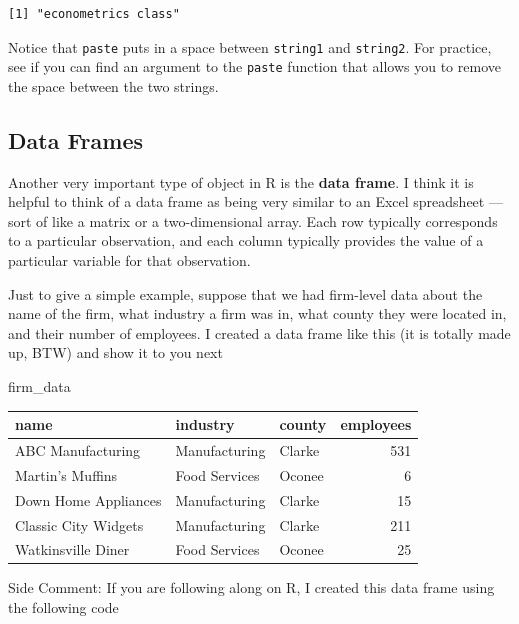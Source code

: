 \documentclass[
  letterpaper,
  DIV=11,
  numbers=noendperiod]{scrreprt}
\newenvironment{Shaded}{\begin{snugshade}}{\end{snugshade}}
\newcommand{\NormalTok}[1]{\textcolor[rgb]{0.00,0.23,0.31}{#1}}
\begin{document}
\begin{verbatim}
[1] "econometrics class"
\end{verbatim}

Notice that \texttt{paste} puts in a space between \texttt{string1} and
\texttt{string2}. For practice, see if you can find an argument to the
\texttt{paste} function that allows you to remove the space between the
two strings.

\subsection{Data Frames}\label{data-frames}

Another very important type of object in R is the \textbf{data frame}. I
think it is helpful to think of a data frame as being very similar to an
Excel spreadsheet --- sort of like a matrix or a two-dimensional array.
Each row typically corresponds to a particular observation, and each
column typically provides the value of a particular variable for that
observation.

Just to give a simple example, suppose that we had firm-level data about
the name of the firm, what industry a firm was in, what county they were
located in, and their number of employees. I created a data frame like
this (it is totally made up, BTW) and show it to you next

\begin{Shaded}
\begin{Highlighting}[]
\NormalTok{firm\_data}
\end{Highlighting}
\end{Shaded}

\begin{longtable}[]{@{}lllr@{}}
\toprule\noalign{}
name & industry & county & employees \\
\midrule\noalign{}
\endhead
\bottomrule\noalign{}
\endlastfoot
ABC Manufacturing & Manufacturing & Clarke & 531 \\
Martin's Muffins & Food Services & Oconee & 6 \\
Down Home Appliances & Manufacturing & Clarke & 15 \\
Classic City Widgets & Manufacturing & Clarke & 211 \\
Watkinsville Diner & Food Services & Oconee & 25 \\
\end{longtable}

{Side Comment:} If you are following along on R, I created this data
frame using the following code
\end{document}

